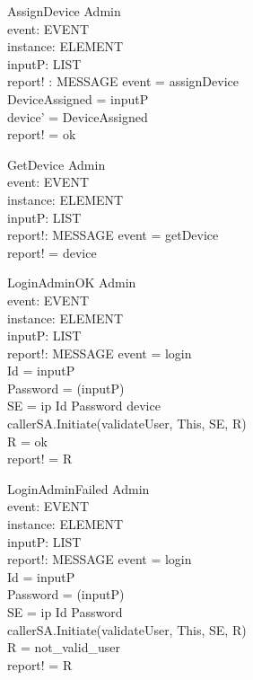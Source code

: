 \begin{schema}{AssignDevice}
\Delta Admin \\ 
event: EVENT \\
instance: ELEMENT \\
inputP: LIST \\
report! : MESSAGE 
\where event = assignDevice \\
DeviceAssigned = \head inputP \\
device' = DeviceAssigned \\
report! = ok 
\end{schema}

\begin{schema}{GetDevice}
\Delta Admin \\ 
event: EVENT \\
instance: ELEMENT \\
inputP: LIST \\
report!: MESSAGE
\where event = getDevice \\
report! = device 
\end{schema}

\begin{schema}{LoginAdminOK}
\Delta Admin  \\
event: EVENT \\
instance: ELEMENT \\
inputP: LIST \\
report!: MESSAGE
\where event = login \\
Id = \head inputP \\
Password = \head (\tail inputP) \\
SE = \lseq ip Id Password device \rseq \\
callerSA.Initiate(validateUser, This, SE, R)\\
R = ok \\
report! = R 
\end{schema}

\begin{schema}{LoginAdminFailed}
\Delta Admin  \\
event: EVENT \\
instance: ELEMENT \\
inputP: LIST \\
report!: MESSAGE
\where event = login \\
Id = \head inputP \\
Password = \head (\tail inputP) \\
SE = \lseq ip Id Password \rseq \\
callerSA.Initiate(validateUser, This, SE, R)\\
R = not\_valid\_user \\ 
report! = R
\end{schema}

